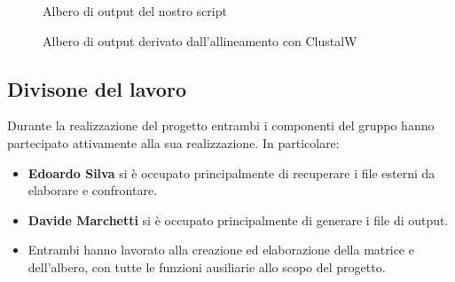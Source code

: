 \documentclass[11pt,italian]{article}
\begin{document}
\newpage
\begin{figure}[H]
  \caption{Albero di output del nostro script}
  \label{fig:script-tree}
\end{figure}
\begin{figure}[H]
  \caption{Albero di output derivato dall'allineamento con ClustalW}
  \label{fig:tool-tree}
\end{figure}

\newpage
\subsection{Divisone del lavoro}
Durante la realizzazione del progetto entrambi i componenti del gruppo hanno partecipato attivamente alla sua realizzazione. In particolare:
\begin{itemize}
  \item \textbf{Edoardo Silva} si è occupato principalmente di recuperare i file esterni da elaborare e confrontare.
  \item \textbf{Davide Marchetti} si è occupato principalmente di generare i file di output.
  \item Entrambi hanno lavorato alla creazione ed elaborazione della matrice e dell'albero, con tutte le funzioni ausiliarie allo scopo del progetto.
\end{itemize}
\end{document}
